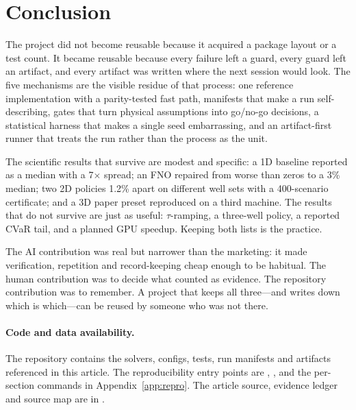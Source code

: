 \section{Conclusion}
\label{sec:conclusion}

The project did not become reusable because it acquired a package layout or a
test count. It became reusable because every failure left a guard, every guard
left an artifact, and every artifact was written where the next session would
look. The five mechanisms are the visible residue of that process: one reference
implementation with a parity-tested fast path, manifests that make a run
self-describing, gates that turn physical assumptions into go/no-go decisions, a
statistical harness that makes a single seed embarrassing, and an artifact-first
runner that treats the run rather than the process as the unit.

The scientific results that survive are modest and specific: a 1D baseline
reported as a median with a 7$\times$ spread; an FNO repaired from worse than
zeros to a 3\% median; two 2D policies 1.2\% apart on different well sets with a
400-scenario certificate; and a 3D paper preset reproduced on a third machine.
The results that do not survive are just as useful: $\tau$-ramping, a three-well
policy, a reported CVaR tail, and a planned GPU speedup. Keeping both lists is
the practice.

The AI contribution was real but narrower than the marketing: it made
verification, repetition and record-keeping cheap enough to be habitual. The
human contribution was to decide what counted as evidence. The repository
contribution was to remember. A project that keeps all three---and writes down
which is which---can be reused by someone who was not there.

\paragraph{Code and data availability.}
The repository contains the solvers, configs, tests, run manifests and artifacts
referenced in this article. The reproducibility entry points are
, , and the per-section commands in Appendix~\ref{app:repro}. The
article source, evidence ledger and source map are in .
